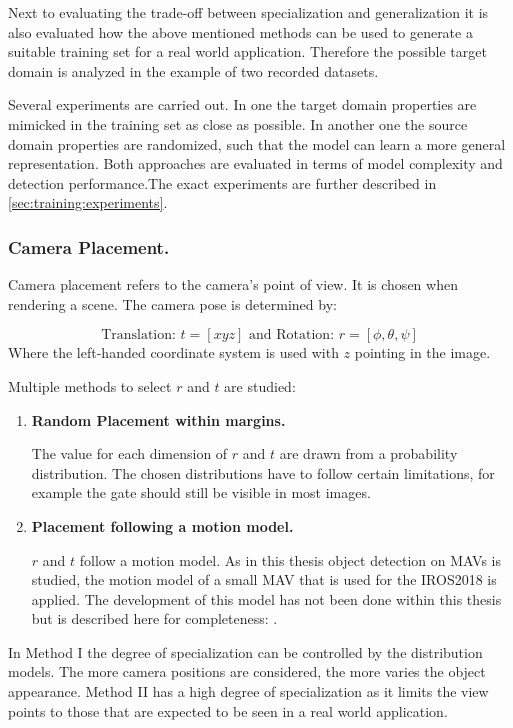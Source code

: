 Next to evaluating the trade-off between specialization and generalization it is also evaluated how the above mentioned methods can be used to generate a suitable training set for a real world application. Therefore the possible target domain is analyzed in the example of two recorded datasets. 

Several experiments are carried out. In one the target domain properties are mimicked in the training set as close as possible. In another one the source domain properties are randomized, such that the model can learn a more general representation. Both approaches are evaluated in terms of model complexity and detection performance.The exact experiments are further described in \autoref{sec:training:experiments}.

\subsubsection{Camera Placement.}

Camera placement refers to the camera's point of view. It is chosen when rendering a scene. The camera pose is determined by:

$$
\text{Translation: }t = [x y z] \text{ and Rotation: } r = [\phi, \theta, \psi]
$$
Where the left-handed coordinate system is used with $z$ pointing in the image.

Multiple methods to select $r$ and $t$ are studied:

\begin{enumerate}
	\item \textbf{Random Placement within margins.}

		  The value for each dimension of $r$ and $t$ are drawn from a probability distribution. The chosen distributions have to follow certain limitations, for example the gate should still be visible in most images.

	\item \textbf{Placement following a motion model.}

		$r$ and $t$ follow a motion model. As in this thesis object detection on \acp{MAV} is studied, the motion model of a small \ac{MAV} that is used for the IROS2018 is applied. The development of this model has not been done within this thesis but is described here for completeness: .

\end{enumerate}

In Method I the degree of specialization can be controlled by the distribution models. The more camera positions are considered, the more varies the object appearance. Method II has a high degree of specialization as it limits the view points to those that are expected to be seen in a real world application.

